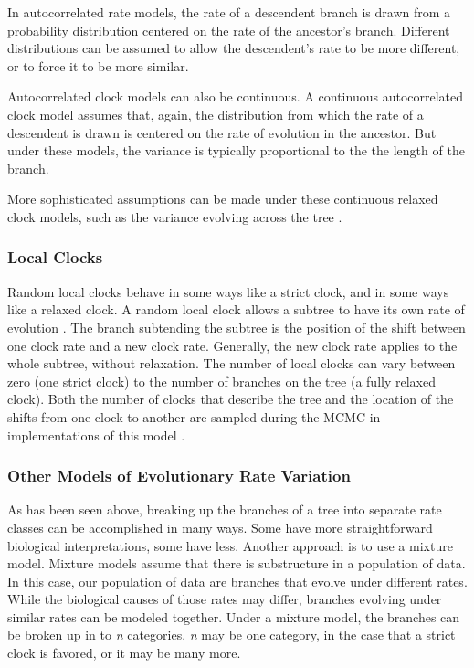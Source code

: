 \documentclass[11pt]{article}
\begin{document}
In autocorrelated rate models, the rate of a descendent branch is drawn from a probability distribution \cite{Aris-Brosou2002} centered on the rate of the ancestor's branch. 
Different distributions can be assumed to allow the descendent's rate to be more different, or to force it to be more similar. 


Autocorrelated clock models can also be continuous.
A continuous autocorrelated clock model assumes that, again, the distribution from which the rate of a descendent is drawn is centered on the rate of evolution in the ancestor.
But under these models, the variance is typically proportional to the the length of the branch.

More sophisticated assumptions can be made under these continuous relaxed clock models, such as the variance evolving across the tree \cite{Thorne1998, Kishino2001, Thorne2002, Aris-Brosou2002, Aris-Brosou2003}.

\subsubsection{Local Clocks}

Random local clocks behave in some ways like a strict clock, and in some ways like a relaxed clock. 
A random local clock allows a subtree to have its own rate of evolution \cite{yoder2000}. 
The branch subtending the subtree is the position of the shift between one clock rate and a new clock rate. 
Generally, the new clock rate applies to the whole subtree, without relaxation.
The number of local clocks can vary between zero (one strict clock) to the number of branches on the tree (a fully relaxed clock).
Both the number of clocks that describe the tree and the location of the shifts from one clock to another are sampled during the MCMC in implementations of this model \cite{Drummond2010}. 


\subsubsection{Other Models of Evolutionary Rate Variation}

As has been seen above, breaking up the branches of a tree into separate rate classes can be accomplished in many ways.
Some have more straightforward biological interpretations, some have less. 
Another approach is to use a mixture model.
Mixture models assume that there is substructure in a population of data.
In this case, our population of data are branches that evolve under different rates.
While the biological causes of those rates may differ, branches evolving under similar rates can be modeled together. 
Under a mixture model, the branches can be broken up in to \textit{n} categories.
\textit{n} may be one category, in the case that a strict clock is favored, or it may be many more.
\end{document}
